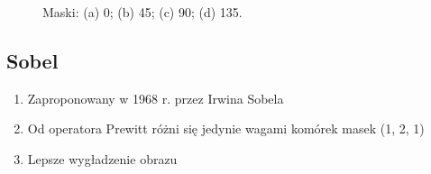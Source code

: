 \documentclass[a4paper,twocolumn,12pt]{article}
\begin{document}
\begin{figure}[!ht]
 \begin{center}
 \end{center}
 \caption{
  Maski:
  (a) 0\textdegree;
  (b) 45\textdegree;
  (c) 90\textdegree;
  (d) 135\textdegree.
 }
 \label{fig:prewitt_matrices}
\end{figure}


\subsection{Sobel}

\begin{enumerate}
 \item Zaproponowany w 1968 r. przez Irwina Sobela
 \item Od operatora Prewitt różni się jedynie wagami komórek masek (1, 2, 1)
 \item Lepsze wygładzenie obrazu
\end{enumerate}
\end{document}
